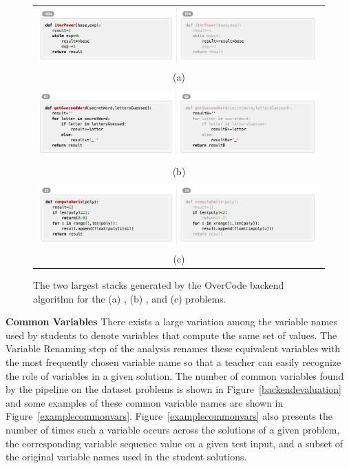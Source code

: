 \begin{figure}[h!]
\begin{tabular}{c}
\\
\includegraphics[scale=0.42]{Body/figures/overcode/iterpower-toptwo}
\\ (a) \\ \\
\includegraphics[scale=0.42]{Body/figures/overcode/hangman-toptwo}
\\ (b) \\ \\
\includegraphics[scale=0.42]{Body/figures/overcode/compderiv-toptwo}
\\ (c) \\
\end{tabular}
\caption{The two largest stacks generated by the OverCode backend algorithm for the (a) , (b) , and (c)   problems.}
\label{toptwostacks}
\end{figure}

{\bf Common Variables} There exists a large variation among the variable names used by students to denote variables that compute the same set of values. The Variable Renaming step of the analysis renames these equivalent variables with the most frequently chosen variable name so that a teacher can easily recognize the role of variables in a given solution. The number of common variables found by the pipeline on the dataset problems is shown in Figure~\ref{backendevaluation} and some examples of these common variable names are shown in Figure~\ref{examplecommonvars}. Figure~\ref{examplecommonvars} also presents the number of times such a variable occurs across the solutions of a given problem, the corresponding variable sequence value on a given test input, and a subset of the original variable names used in the student solutions. 

